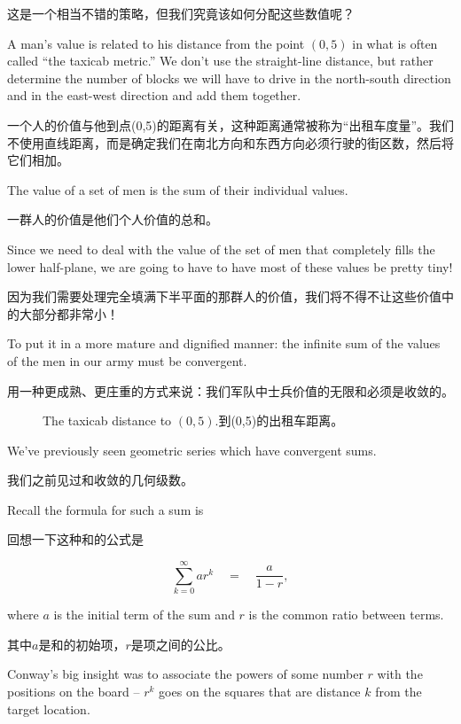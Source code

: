 这是一个相当不错的策略，但我们究竟该如何分配这些数值呢？

A man's value is related to his distance from the point $(0,5)$ in what
is often called ``the taxicab metric.''   We don't use the straight-line
distance, but rather determine the number of blocks we will have to drive
in the north-south direction and in the east-west direction and add them 
together.

一个人的价值与他到点(0,5)的距离有关，这种距离通常被称为“出租车度量”。我们不使用直线距离，而是确定我们在南北方向和东西方向必须行驶的街区数，然后将它们相加。

The value of a set of men is the sum of their individual values.

一群人的价值是他们个人价值的总和。

Since we need to deal with the value of the set of men that completely fills
the lower half-plane, we are going to have to have most of these values be
pretty tiny!

因为我们需要处理完全填满下半平面的那群人的价值，我们将不得不让这些价值中的大部分都非常小！

To put it in a more mature and dignified manner: the infinite
sum of the values of the men in our army must be convergent.

用一种更成熟、更庄重的方式来说：我们军队中士兵价值的无限和必须是收敛的。

\begin{figure}[!hbtp] 
\begin{center}

\end{center}
\caption[The taxicab distance to $(0,5)$.到(0,5)的出租车距离。]{The taxicab distance to $(0,5)$.到(0,5)的出租车距离。}
\label{fig:taxicab_distance}
\end{figure}

We've previously seen geometric series which have convergent sums.

我们之前见过和收敛的几何级数。

Recall 
the formula for such a sum is

回想一下这种和的公式是

\[ \sum_{k=0}^{\infty} ar^k  \quad = \quad \frac{a}{1-r}, \]

\noindent where $a$ is the initial term of the sum and $r$ is the common
ratio between terms.

\noindent 其中$a$是和的初始项，$r$是项之间的公比。

Conway's big insight was to associate the powers of some number $r$ with
the positions on the board -- $r^k$ goes on the squares that are distance
$k$ from the target location.

